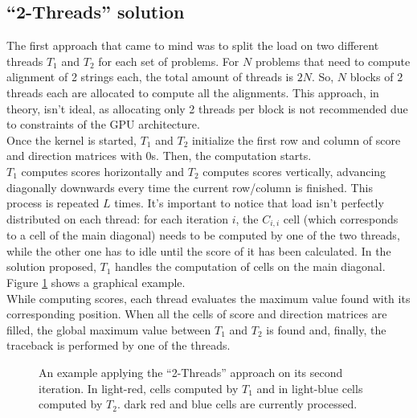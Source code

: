 \documentclass{article}
\begin{document}
\subsection{``2-Threads'' solution}
\noindent
The first approach that came to mind was to split the load on two different threads \(T_1\) and \(T_2\) for each set of problems. For \(N\) problems that need to compute alignment of 2 strings each, the total amount of threads is \(2N\). So, \(N\) blocks of \(2\) threads each are allocated to compute all the alignments. This approach, in theory, isn't ideal, as allocating only 2 threads per block is not recommended due to constraints of the GPU architecture.\\
Once the kernel is started, \(T_1\) and \(T_2\) initialize the first row and column of score and direction matrices with 0s. Then, the computation starts.\\
\(T_1\) computes scores horizontally and \(T_2\) computes scores vertically, advancing diagonally downwards every time the current row/column is finished. This process is repeated \(L\) times. It's important to notice that load isn't perfectly distributed on each thread: for each iteration \(i\), the \(C_{i,i}\) cell (which corresponds to a cell of the main diagonal) needs to be computed by one of the two threads, while the other one has to idle until the score of it has been calculated. In the solution proposed, \(T_1\) handles the computation of cells on the main diagonal. Figure \ref{fig_2-threads} shows a graphical example.\\
While computing scores, each thread evaluates the maximum value found with its corresponding position. When all the cells of score and direction matrices are filled, the global maximum value between \(T_1\) and \(T_2\) is found and, finally, the traceback is performed by one of the threads.

\begin{figure}[H]
\centering

\captionsetup{justification=centering}
\caption{\label{fig_2-threads}An example applying the ``2-Threads'' approach on its second iteration. In light-red, cells computed by \(T_1\) and in light-blue cells computed by \(T_2\). dark red and blue cells are currently processed.}
\end{figure}
\end{document}
